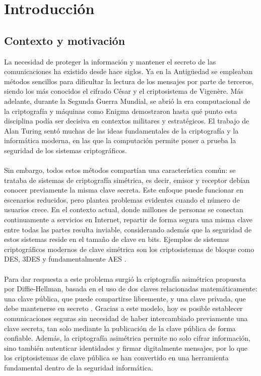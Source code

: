 \chapter{Introducción}

\section{Contexto y motivación}

La necesidad de proteger la información y mantener el secreto de las comunicaciones ha existido desde hace siglos. Ya en la Antigüedad se empleaban métodos sencillos para dificultar la lectura de los mensajes por parte de terceros, siendo los más conocidos el cifrado César y el criptosistema de Vigenère. Más adelante, durante la Segunda Guerra Mundial, se abrió la era computacional de la criptografía y máquinas como Enigma demostraron hasta qué punto esta disciplina podía ser decisiva en contextos militares y estratégicos. El trabajo de Alan Turing sentó muchas de las ideas fundamentales de la criptografía y la informática moderna, en las que la computación permite poner a prueba la seguridad de los sistemas criptográficos.
\\
\\
Sin embargo, todos estos métodos compartían una característica común: se trataba de sistemas de criptografía simétrica, es decir, emisor y receptor debían conocer previamente la misma clave secreta. Este enfoque puede funcionar en escenarios reducidos, pero plantea problemas evidentes cuando el número de usuarios crece. En el contexto actual, donde millones de personas se conectan continuamente a servicios en Internet, repartir de forma segura una misma clave entre todas las partes resulta inviable, considerando además que la seguridad de estos sistemas reside en el tamaño de clave en bits. Ejemplos de sistemas criptográficos modernos de clave simétrica son los criptosistemas de bloque como DES, 3DES y fundamentalmente AES \citep{nist_fips197_upd1}.
\\
\\
Para dar respuesta a este problema surgió la criptografía asimétrica propuesta por Diffie-Hellman, basada en el uso de dos claves relacionadas matemáticamente: una clave pública, que puede compartirse libremente, y una clave privada, que debe mantenerse en secreto \citep{rivest1978method}. Gracias a este modelo, hoy es posible establecer comunicaciones seguras sin necesidad de haber intercambiado previamente una clave secreta, tan solo mediante la publicación de la clave pública de forma confiable. Además, la criptografía asimétrica permite no solo cifrar información, sino también autenticar identidades y firmar digitalmente mensajes, por lo que los criptosistemas de clave pública se han convertido en una herramienta fundamental dentro de la seguridad informática.
